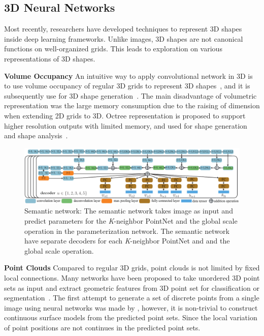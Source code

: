 \subsection{3D Neural Networks}
Most recently, researchers have developed techniques to represent 3D shapes inside deep learning frameworks.%
Unlike images, 3D shapes are not canonical functions on well-organized grids. 
This leads to exploration on various representations of 3D shapes.

\noindent\textbf{Volume Occupancy} 
An intuitive way to apply convolutional network in 3D is to use volume occupancy of regular 3D grids to represent 3D shapes~\cite{3dshapenet}, and it is subsequently use for 3D shape generation~\cite{3DR2N2,learnobj}.
%
The main disadvantage of volumetric representation was the large memory consumption due to the raising of dimension when extending 2D grids to 3D. 
Octree representation is proposed to support higher resolution outputs with limited memory, and used for shape generation~\cite{octreegen} and shape analysis~\cite{ocnn}.

\begin{figure}[htbp]
	\centering
	\includegraphics[width=\linewidth]{img/net/semnet}
	\caption{Semantic network: The semantic network takes image as input and predict parameters for the \textit{K}-neighbor PointNet and the global scale operation in the parameterization network. The semantic network have separate decoders for each \textit{K}-neighbor PointNet and and the global scale operation. }
	\label{fig:semnet}
\end{figure}

\noindent\textbf{Point Clouds} 
Compared to regular 3D grids, point clouds is not limited by fixed local connections.
Many networks have been proposed to take unordered 3D point sets as input and extract geometric features from 3D point set for classification or segmentation~\cite{PointNet,NIPS2017_7095,pointcnn}.
%
The first attempt to generate a set of discrete points from a single image using neural networks was made by \cite{PSGN}, however, it is non-trivial to construct continuous surface models from the predicted point sets. Since the local variation of point positions are not continues in the predicted point sets.

